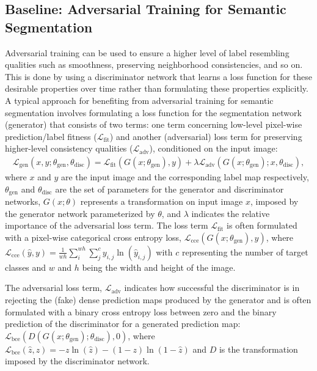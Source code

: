 \documentclass{article} \usepackage{nips13submit_e,times}
\begin{document}
\subsection{Baseline: Adversarial Training for Semantic Segmentation}

Adversarial training can be used to ensure a higher level of label resembling qualities such as smoothness, preserving neighborhood consistencies, and so on.
This is done by using a discriminator network that learns a loss function for these desirable properties over time rather than formulating these properties explicitly.
A typical approach for benefiting from adversarial training for semantic segmentation \cite{luc2016semantic,isola2017image} involves formulating a loss function for the segmentation network (generator) that consists of two terms:
one term concerning low-level pixel-wise prediction/label fitness ($\mathcal{L}_\text{fit}$) and another (adversarial) loss term for preserving higher-level consistency qualities ($\mathcal{L}_\text{adv}$), conditioned on the input image:
\begin{align}
\mathcal{L}_\text{gen}(x, y; \theta_\text{gen}, \theta_\text{disc}) = \mathcal{L}_\text{fit}(G(x; \theta_\text{gen}), y) + \lambda \mathcal{L}_\text{adv}(G(x; \theta_\text{gen}); x, \theta_\text{disc}),
\label{eq:lgen_regular}
\end{align}
where $x$ and $y$ are the input image and the corresponding label map respectively, $\theta_\text{gen}$ and $\theta_\text{disc}$ are the set of parameters for the generator and discriminator networks, $G(x;\theta)$ represents a transformation on input image $x$, imposed by the generator network parameterized by $\theta$, and $\lambda$ indicates the relative importance of the adversarial loss term.
The loss term $\mathcal{L}_\text{fit}$ is often formulated with a pixel-wise categorical cross entropy loss, $\mathcal{L}_\text{cce}(G(x; \theta_\text{gen}), y)$, where $\mathcal{L}_\text{cce}(\hat{y}, y) = \frac{1}{wh}\sum_{i}^{wh} \sum_{j}^{c} y_{i,j} \ln(\hat{y}_{i, j})$ with $c$ representing the number of target classes and $w$ and $h$ being the width and height of the image.

The adversarial loss term, $\mathcal{L}_\text{adv}$ indicates how successful the discriminator is in rejecting the (fake) dense prediction maps produced by the generator and is often formulated with a binary cross entropy loss between zero and the binary prediction of the discriminator for a generated prediction map: $\mathcal{L}_\text{bce}(D(G(x; \theta_\text{gen});\theta_\text{disc}), 0)$, where $\mathcal{L}_\text{bce}(\hat{z}, z) = -z \ln(\hat{z})-(1-z) \ln(1-\hat{z})$ and $D$ is the transformation imposed by the discriminator network.
\end{document}

